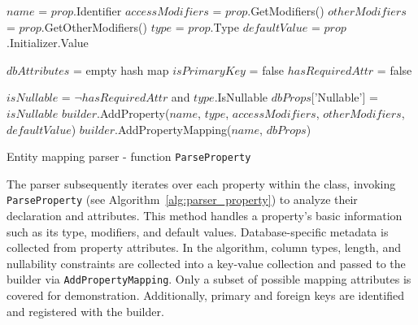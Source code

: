 \begin{algorithm}[!p]
    \small
    \DontPrintSemicolon
    
    
    $name$ = $prop$.Identifier\;
    $accessModifiers$ = $prop$.GetModifiers()\;
    $otherModifiers$ = $prop$.GetOtherModifiers()\;
    $type$ = $prop$.Type\;
    $defaultValue$ = $prop$.Initializer.Value\;

    $dbAttributes$ = empty hash map\;
    $isPrimaryKey$ = false\;
    $hasRequiredAttr$ = false\;

    \BlankLine
    \BlankLine
    $isNullable$ = $\neg hasRequiredAttr$ and $type$.IsNullable\;
    $dbProps$['Nullable'] = $isNullable$\;
    \BlankLine
    $builder$.AddProperty($name$, $type$, $accessModifiers$, $otherModifiers$, $defaultValue$)\;
    $builder$.AddPropertyMapping($name$, $dbProps$)\;


    
    \caption{Entity mapping parser - function \texttt{ParseProperty}}
    \label{alg:parser_property}
\end{algorithm}

The parser subsequently iterates over each property within the class, invoking \texttt{ParseProperty} (see Algorithm~\ref{alg:parser_property}) to analyze their declaration and attributes. This method handles a property's basic information such as its type, modifiers, and default values. Database-specific metadata is collected from property attributes. In the algorithm, column types, length, and nullability constraints are collected into a key-value collection and passed to the builder via \texttt{AddPropertyMapping}. Only a subset of possible mapping attributes is covered for demonstration. Additionally, primary and foreign keys are identified and registered with the builder.



